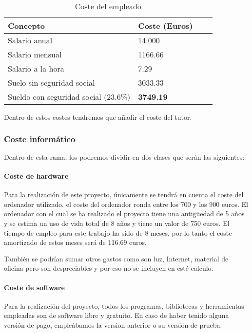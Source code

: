 \begin{table}[htbp]
	\begin{center}
		\begin{tabular}{llll}
			Concepto                           & Coste (Euros)\\ \hline
			Salario anual              		   & 14.000 \\ 
			Salario mensual					   & 1166.66\\ 
			Salario a la hora                  & 7.29  \\ 
			Suelo sin seguridad social 		   & 3033.33 \\
			Sueldo con seguridad social (23.6\%)& \textbf{3749.19} \\\hline
		\end{tabular}
	\caption{Coste del empleado}
	\label{tabla:tabla3}
	\end{center}
\end{table}

Dentro de estos costes tendremos que añadir el coste del tutor.

\subsubsection{Coste informático}

Dentro de esta rama, los podremos dividir en dos clases que serán las siguientes:
 
\paragraph{Coste de hardware}

Para la realización de este proyecto, únicamente se tendrá en cuenta el coste del ordenador utilizado, el coste del ordenador ronda entre los 700 y los 900 euros.
El ordenador con el cual se ha realizado el proyecto tiene una antigüedad de 5 años y se estima un uso de vida total de 8 años y tiene un valor de 750 euros. El tiempo de empleo para este trabajo ha sido de 8 meses, por lo tanto el coste amortizado de estos meses será de 116.69 euros.

También se podrían sumar otros gastos como son luz, Internet, material de oficina pero son despreciables y por eso no se incluyen en esté calculo.

\paragraph{Coste de software}

Para la realización del proyecto, todos los programas, bibliotecas y herramientas empleadas son de software libre y gratuito. En caso de haber tenido alguna versión de pago, empleábamos la version anterior o su versión de prueba.

